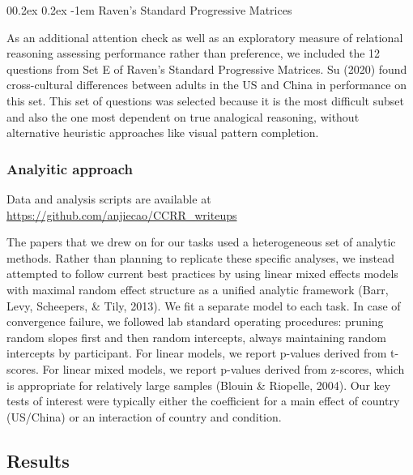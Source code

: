 \documentclass[
  man,floatsintext]{apa6}
\makeatletter
\let\oldparagraph\paragraph
\renewcommand{\paragraph}[1]{\oldparagraph{#1}\mbox{}}
\renewcommand{\paragraph}{\@startsection{paragraph}{4}{\parindent}%
  {0\baselineskip \@plus 0.2ex \@minus 0.2ex}%
  {-1em}%
  {\normalfont\normalsize\bfseries\itshape\typesectitle}}
\makeatother
\begin{document}
\hypertarget{ravens-standard-progressive-matrices}{%
\paragraph{Raven's Standard Progressive Matrices}\label{ravens-standard-progressive-matrices}}

As an additional attention check as well as an exploratory measure of relational reasoning assessing performance rather than preference, we included the 12 questions from Set E of Raven's Standard Progressive Matrices. Su (2020) found cross-cultural differences between adults in the US and China in performance on this set. This set of questions was selected because it is the most difficult subset and also the one most dependent on true analogical reasoning, without alternative heuristic approaches like visual pattern completion.

\hypertarget{analyitic-approach}{%
\subsubsection{Analyitic approach}\label{analyitic-approach}}

Data and analysis scripts are available at \url{https://github.com/anjiecao/CCRR_writeups}

The papers that we drew on for our tasks used a heterogeneous set of analytic methods. Rather than planning to replicate these specific analyses, we instead attempted to follow current best practices by using linear mixed effects models with maximal random effect structure as a unified analytic framework (Barr, Levy, Scheepers, \& Tily, 2013). We fit a separate model to each task. In case of convergence failure, we followed lab standard operating procedures: pruning random slopes first and then random intercepts, always maintaining random intercepts by participant. For linear models, we report p-values derived from t-scores. For linear mixed models, we report p-values derived from z-scores, which is appropriate for relatively large samples (Blouin \& Riopelle, 2004). Our key tests of interest were typically either the coefficient for a main effect of country (US/China) or an interaction of country and condition.

\hypertarget{results}{%
\subsection{Results}\label{results}}
\end{document}
